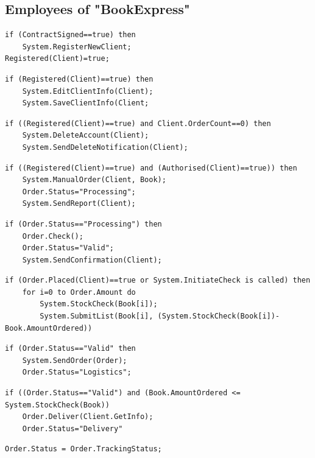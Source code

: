 \documentclass[11pt,a4paper,oneside,svgnames]{report}
\begin{document}
\subsection{Employees of "BookExpress"}
\begin{lstlisting}[caption=/PF00/Register Publisher or Book shop (client)]
if (ContractSigned==true) then  
	System.RegisterNewClient;
Registered(Client)=true;
\end{lstlisting}
\begin{lstlisting}[caption=/PF01/Edit client information]
if (Registered(Client)==true) then  
	System.EditClientInfo(Client);
	System.SaveClientInfo(Client;
\end{lstlisting}
\begin{lstlisting}[caption=/PF02/Delete Account]
if ((Registered(Client)==true) and Client.OrderCount==0) then  
	System.DeleteAccount(Client);
	System.SendDeleteNotification(Client);
\end{lstlisting}
\begin{lstlisting}[caption=/PF10/ Client places Order]
if ((Registered(Client)==true) and (Authorised(Client)==true)) then  
	System.ManualOrder(Client, Book);
	Order.Status="Processing";
	System.SendReport(Client);
\end{lstlisting}
\begin{lstlisting}[caption=/PF11/ Validate Order]
if (Order.Status=="Processing") then 
	Order.Check();
	Order.Status="Valid";
	System.SendConfirmation(Client);
\end{lstlisting}
\begin{lstlisting}[caption=/PF12/ Stock Update]
if (Order.Placed(Client)==true or System.InitiateCheck is called) then
	for i=0 to Order.Amount do
		System.StockCheck(Book[i]);
		System.SubmitList(Book[i], (System.StockCheck(Book[i])-Book.AmountOrdered))
\end{lstlisting}
\begin{lstlisting}[caption=/PF13/ Forward Order to Logistics]
if (Order.Status=="Valid" then
	System.SendOrder(Order);
	Order.Status="Logistics";
\end{lstlisting}
\begin{lstlisting}[caption=/PF14/ Deliver Order]
if ((Order.Status=="Valid") and (Book.AmountOrdered <= System.StockCheck(Book))
	Order.Deliver(Client.GetInfo);
	Order.Status="Delivery"
\end{lstlisting}
\begin{lstlisting}[caption=/PF15/ Confirm Delivery]
 Order.Status = Order.TrackingStatus;
\end{lstlisting}
\end{document}
